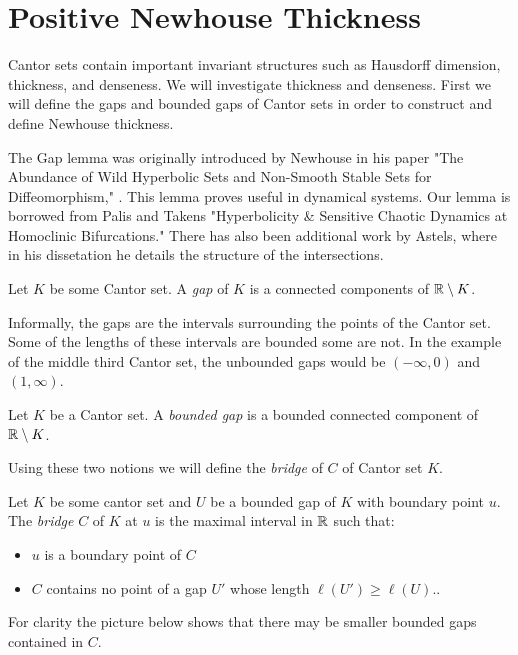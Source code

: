\section{Positive Newhouse Thickness}
Cantor sets contain important invariant structures such as Hausdorff dimension, thickness, and denseness.  We will investigate thickness and denseness.  First we will define the gaps and bounded gaps of Cantor sets in order to construct and define Newhouse thickness. 

The Gap lemma was originally introduced by Newhouse in his paper "The Abundance of Wild Hyperbolic Sets and Non-Smooth Stable Sets for Diffeomorphism," \cite{Newhouse}.  This lemma proves useful in dynamical systems.  Our lemma is borrowed from Palis and Takens "Hyperbolicity \& Sensitive Chaotic Dynamics at Homoclinic Bifurcations."  There has also been additional work by Astels, where in his dissetation \cite{Astels} he details the structure of the intersections.  
\begin{definition}[Gap]
    Let $K$ be some Cantor set.  A \textit{gap} of $K$ is a connected components of $\mathbb{R} \setminus K$.      
\end{definition}  Informally, the gaps are the intervals surrounding the points of the Cantor set.  Some of the lengths of these intervals are bounded some are not.  In the example of the middle third Cantor set, the unbounded gaps would be $(-\infty, 0)$ and $(1, \infty)$.  

\begin{definition}
    Let $K$ be a Cantor set.  A \textit{bounded gap} is a bounded connected component of $\mathbb{R} \setminus K$.      
\end{definition}

Using these two notions we will define the \textit{bridge} of $C$ of Cantor set $K$.  
\begin{definition}[Bridge]\cite{palis&takens}
    Let $K$ be some cantor set and $U$ be a bounded gap of $K$ with boundary point $u$.  The \textit{bridge} $C$ of $K$ at $u$ is the maximal interval in $\mathbb{R}$ such that:
    \begin{itemize}
        \item $u$ is a boundary point of $C$
        \item $C$ contains no point of a gap $U'$ whose length $\ell(U') \geq \ell(U)$..
    \end{itemize}
\end{definition}

For clarity the picture below shows that there may be smaller bounded gaps contained in $C$.  

